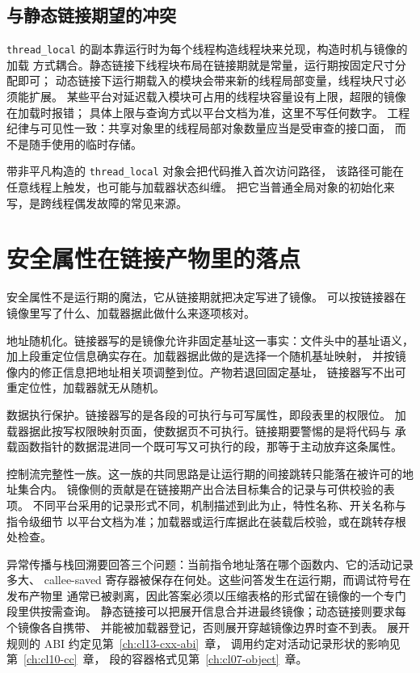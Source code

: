 \documentclass[12pt,a4paper,fontset=fandol]{ctexbook}
\newcommand{\Tp}[1]{\texttt{#1}}
\begin{document}
\subsection{与静态链接期望的冲突}

\Tp{thread\_local} 的副本靠运行时为每个线程构造线程块来兑现，构造时机与镜像的加载
方式耦合。静态链接下线程块布局在链接期就是常量，运行期按固定尺寸分配即可；
动态链接下运行期载入的模块会带来新的线程局部变量，线程块尺寸必须能扩展。
某些平台对延迟载入模块可占用的线程块容量设有上限，超限的镜像在加载时报错；
具体上限与查询方式以平台文档为准，这里不写任何数字。
工程纪律与可见性一致：共享对象里的线程局部对象数量应当是受审查的接口面，
而不是随手使用的临时存储。

\begin{warning}[title={线程局部对象与加载期执行}]
  带非平凡构造的 \Tp{thread\_local} 对象会把代码推入首次访问路径，
  该路径可能在任意线程上触发，也可能与加载器状态纠缠。
  把它当普通全局对象的初始化来写，是跨线程偶发故障的常见来源。
\end{warning}

\section{安全属性在链接产物里的落点}\label{sec:cl09-security}

安全属性不是运行期的魔法，它从链接期就把决定写进了镜像。
可以按链接器在镜像里写了什么、加载器据此做什么来逐项核对。

地址随机化。链接器写的是镜像允许非固定基址这一事实：文件头中的基址语义，
加上段重定位信息确实存在。加载器据此做的是选择一个随机基址映射，
并按镜像内的修正信息把地址相关项调整到位。产物若退回固定基址，
链接器写不出可重定位性，加载器就无从随机。

数据执行保护。链接器写的是各段的可执行与可写属性，即段表里的权限位。
加载器据此按写权限映射页面，使数据页不可执行。链接期要警惕的是将代码与
承载函数指针的数据混进同一个既可写又可执行的段，那等于主动放弃这条属性。

控制流完整性一族。这一族的共同思路是让运行期的间接跳转只能落在被许可的地址集合内。
镜像侧的贡献是在链接期产出合法目标集合的记录与可供校验的表项。
不同平台采用的记录形式不同，机制描述到此为止，特性名称、开关名称与指令级细节
以平台文档为准；加载器或运行库据此在装载后校验，或在跳转存根处检查。

\begin{note}[title={异常展开表与回溯信息为何必须在镜像里可查}]
  异常传播与栈回溯要回答三个问题：当前指令地址落在哪个函数内、它的活动记录多大、
  callee-saved 寄存器被保存在何处。这些问答发生在运行期，而调试符号在发布产物里
  通常已被剥离，因此答案必须以压缩表格的形式留在镜像的一个专门段里供按需查询。
  静态链接可以把展开信息合并进最终镜像；动态链接则要求每个镜像各自携带、
  并能被加载器登记，否则展开穿越镜像边界时查不到表。
  展开规则的 ABI 约定见第~\ref{ch:cl13-cxx-abi}~章，
  调用约定对活动记录形状的影响见第~\ref{ch:cl10-cc}~章，
  段的容器格式见第~\ref{ch:cl07-object}~章。
\end{note}
\end{document}
